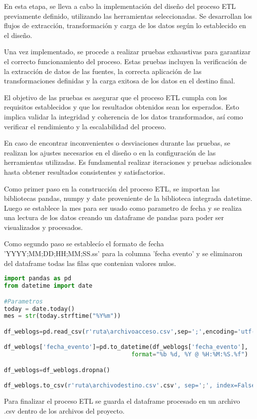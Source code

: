 En esta etapa, se lleva a cabo la implementación del diseño del proceso ETL previamente definido, utilizando las herramientas seleccionadas. Se desarrollan los flujos de extracción, transformación y carga de los datos según lo establecido en el diseño.

Una vez implementado, se procede a realizar pruebas exhaustivas para garantizar el correcto funcionamiento del proceso. Estas pruebas incluyen la verificación de la extracción de datos de las fuentes, la correcta aplicación de las transformaciones definidas y la carga exitosa de los datos en el destino final.

El objetivo de las pruebas es asegurar que el proceso ETL cumpla con los requisitos establecidos y que los resultados obtenidos sean los esperados. Esto implica validar la integridad y coherencia de los datos transformados, así como verificar el rendimiento y la escalabilidad del proceso.

En caso de encontrar inconvenientes o desviaciones durante las pruebas, se realizan los ajustes necesarios en el diseño o en la configuración de las herramientas utilizadas. Es fundamental realizar iteraciones y pruebas adicionales hasta obtener resultados consistentes y satisfactorios.

Como primer paso en la construcción del proceso ETL, se importan las bibliotecas pandas, numpy y date proveniente de la biblioteca integrada datetime. Luego se establece la mes para ser usado como parametro de fecha y se realiza una lectura de los datos creando un dataframe de pandas para poder ser visualizados y procesados.

Como segundo paso se establecío el formato de fecha 'YYYY;MM;DD;HH;MM;SS.ss' para la columna 'fecha evento' y se eliminaron del dataframe todas las filas que contenian valores nulos.


\begin{lstlisting}[language=Python]
import pandas as pd
from datetime import date

#Parametros 
today = date.today()
mes = str(today.strftime("%Y%m"))

df_weblogs=pd.read_csv(r'ruta\archivoacceso.csv',sep=';',encoding='utf-8')

df_weblogs['fecha_evento']=pd.to_datetime(df_weblogs['fecha_evento'],
                                    format="%b %d, %Y @ %H:%M:%S.%f")

df_weblogs=df_weblogs.dropna()

df_weblogs.to_csv(r'ruta\archivodestino.csv'.csv', sep=';', index=False)
\end{lstlisting}

Para finalizar el proceso ETL se guarda el dataframe procesado en un archivo .csv dentro de los archivos del proyecto.